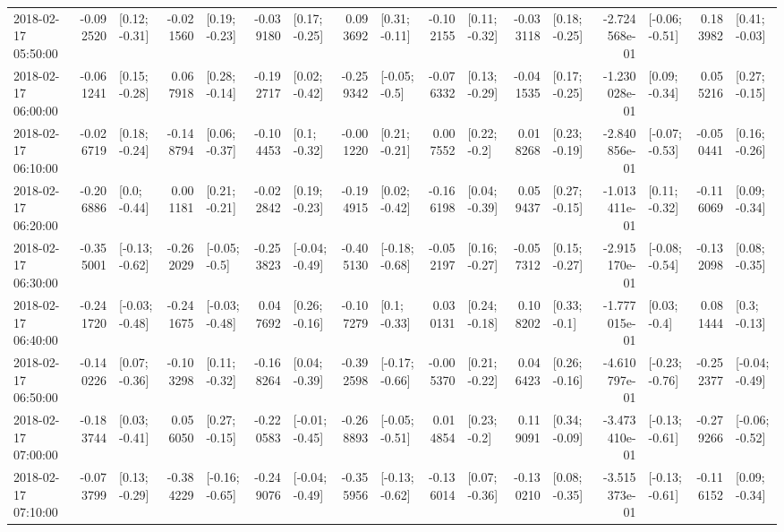\begin{tabular}{lrlrlrlrlrlrlrlrl}
2018-02-17 05:50:00 & -0.092520 &   [0.12; -0.31] & -0.021560 &   [0.19; -0.23] & -0.039180 &   [0.17; -0.25] &  0.093692 &   [0.31; -0.11] & -0.102155 &   [0.11; -0.32] & -0.033118 &   [0.18; -0.25] & -2.724568e-01 &  [-0.06; -0.51] &  0.183982 &   [0.41; -0.03] \\
2018-02-17 06:00:00 & -0.061241 &   [0.15; -0.28] &  0.067918 &   [0.28; -0.14] & -0.192717 &   [0.02; -0.42] & -0.259342 &   [-0.05; -0.5] & -0.076332 &   [0.13; -0.29] & -0.041535 &   [0.17; -0.25] & -1.230028e-01 &   [0.09; -0.34] &  0.055216 &   [0.27; -0.15] \\
2018-02-17 06:10:00 & -0.026719 &   [0.18; -0.24] & -0.148794 &   [0.06; -0.37] & -0.104453 &    [0.1; -0.32] & -0.001220 &   [0.21; -0.21] &  0.007552 &    [0.22; -0.2] &  0.018268 &   [0.23; -0.19] & -2.840856e-01 &  [-0.07; -0.53] & -0.050441 &   [0.16; -0.26] \\
2018-02-17 06:20:00 & -0.206886 &    [0.0; -0.44] &  0.001181 &   [0.21; -0.21] & -0.022842 &   [0.19; -0.23] & -0.194915 &   [0.02; -0.42] & -0.166198 &   [0.04; -0.39] &  0.059437 &   [0.27; -0.15] & -1.013411e-01 &   [0.11; -0.32] & -0.116069 &   [0.09; -0.34] \\
2018-02-17 06:30:00 & -0.355001 &  [-0.13; -0.62] & -0.262029 &   [-0.05; -0.5] & -0.253823 &  [-0.04; -0.49] & -0.405130 &  [-0.18; -0.68] & -0.052197 &   [0.16; -0.27] & -0.057312 &   [0.15; -0.27] & -2.915170e-01 &  [-0.08; -0.54] & -0.132098 &   [0.08; -0.35] \\
2018-02-17 06:40:00 & -0.241720 &  [-0.03; -0.48] & -0.241675 &  [-0.03; -0.48] &  0.047692 &   [0.26; -0.16] & -0.107279 &    [0.1; -0.33] &  0.030131 &   [0.24; -0.18] &  0.108202 &    [0.33; -0.1] & -1.777015e-01 &    [0.03; -0.4] &  0.081444 &    [0.3; -0.13] \\
2018-02-17 06:50:00 & -0.140226 &   [0.07; -0.36] & -0.103298 &   [0.11; -0.32] & -0.168264 &   [0.04; -0.39] & -0.392598 &  [-0.17; -0.66] & -0.005370 &   [0.21; -0.22] &  0.046423 &   [0.26; -0.16] & -4.610797e-01 &  [-0.23; -0.76] & -0.252377 &  [-0.04; -0.49] \\
2018-02-17 07:00:00 & -0.183744 &   [0.03; -0.41] &  0.056050 &   [0.27; -0.15] & -0.220583 &  [-0.01; -0.45] & -0.268893 &  [-0.05; -0.51] &  0.014854 &    [0.23; -0.2] &  0.119091 &   [0.34; -0.09] & -3.473410e-01 &  [-0.13; -0.61] & -0.279266 &  [-0.06; -0.52] \\
2018-02-17 07:10:00 & -0.073799 &   [0.13; -0.29] & -0.384229 &  [-0.16; -0.65] & -0.249076 &  [-0.04; -0.49] & -0.355956 &  [-0.13; -0.62] & -0.136014 &   [0.07; -0.36] & -0.130210 &   [0.08; -0.35] & -3.515373e-01 &  [-0.13; -0.61] & -0.116152 &   [0.09; -0.34] \\

\end{tabular}
